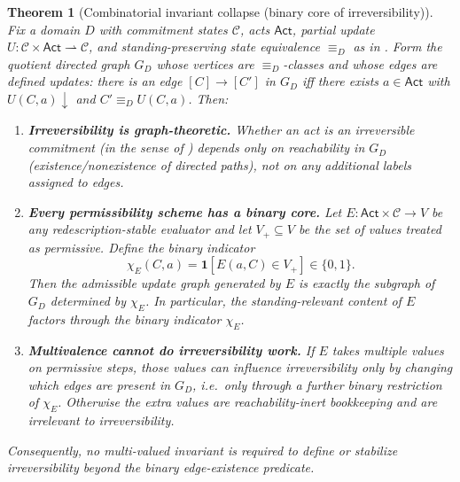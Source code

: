 \documentclass[11pt]{article}
\newtheorem{theorem}{Theorem}[section]
\theoremstyle{definition}
\newcommand{\Act}{\mathsf{Act}}
\newcommand{\ppar}{\rightharpoonup} %
\begin{document}
\begin{theorem}[Combinatorial invariant collapse (binary core of irreversibility)]
\label{thm:combinatorial-binary-core}
Fix a domain $D$ with commitment states $\mathcal{C}$, acts $\Act$, partial update $U:\mathcal{C}\times\Act\ppar\mathcal{C}$,
and standing-preserving state equivalence $\equiv_D$ as in .
Form the quotient directed graph $G_D$ whose vertices are $\equiv_D$-classes and whose edges are \emph{defined} updates:
there is an edge $[C]\to[C']$ in $G_D$ iff there exists $a\in\Act$ with $U(C,a)\downarrow$ and $C'\equiv_D U(C,a)$.
Then:
\begin{enumerate}[label=\textbf{(G\arabic*)}, leftmargin=2.6em]
\item \textbf{Irreversibility is graph-theoretic.}
Whether an act is an irreversible commitment (in the sense of ) depends only on
reachability in $G_D$ (existence/nonexistence of directed paths), not on any additional labels assigned to edges.
\item \textbf{Every permissibility scheme has a binary core.}
Let $E:\Act\times\mathcal{C}\to V$ be any redescription-stable evaluator and let $V_+\subseteq V$ be the set of values treated as
permissive.
Define the binary indicator
\[
\chi_E(C,a)=\mathbf{1}[E(a,C)\in V_+]\in\{0,1\}.
\]
Then the admissible update graph generated by $E$ is exactly the subgraph of $G_D$ determined by $\chi_E$.
In particular, the standing-relevant content of $E$ factors through the binary indicator $\chi_E$.
\item \textbf{Multivalence cannot do irreversibility work.}
If $E$ takes multiple values on permissive steps, those values can influence irreversibility only by changing which edges are
present in $G_D$, i.e.\ only through a further binary restriction of $\chi_E$.
Otherwise the extra values are reachability-inert bookkeeping and are irrelevant to irreversibility.
\end{enumerate}
Consequently, no multi-valued invariant is required to define or stabilize irreversibility beyond the binary edge-existence
predicate.
\end{theorem}
\end{document}
